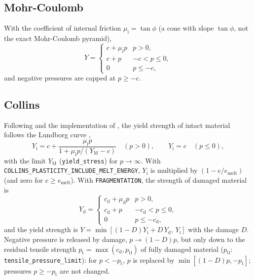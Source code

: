 \documentclass[10pt,fleqn,twoside]{article}
\newcommand{\code}[1]{\texttt{#1}}
\newcommand{\sw}[1]{\texttt{#1}}
\begin{document}
\subsection{Mohr-Coulomb}
With the coefficient of internal friction $\mu_\mathrm{i} = \tan\phi$ (a cone with slope $\tan\phi$, not the exact
Mohr-Coulomb pyramid),
\begin{equation}
 Y = \begin{cases} c + \mu_\mathrm{i} p & p > 0,\\ c + p & -c < p \leq 0,\\ 0 & p \leq -c, \end{cases}
\end{equation}
and negative pressures are capped at $p \geq -c$.

\subsection{Collins}
Following \citet{collins2004} and the implementation of \citet{2015P&SS..107....3J}, the yield strength of intact
material follows the Lundborg curve \citep{lundborg1968},
\begin{equation}
 Y_\mathrm{i} = c + \frac{\mu_\mathrm{i} p}{1 + \mu_\mathrm{i} p/(Y_\mathrm{M} - c)} \quad (p > 0), \qquad
 Y_\mathrm{i} = c \quad (p \leq 0),
\end{equation}
with the limit $Y_\mathrm{M}$ (\code{yield\_stress}) for $p \to \infty$. With
\sw{COLLINS\_PLASTICITY\_INCLUDE\_MELT\_ENERGY}, $Y_\mathrm{i}$ is multiplied by $(1 - e/e_\mathrm{melt})$ (and zero
for $e \geq e_\mathrm{melt}$). With \sw{FRAGMENTATION}, the strength of damaged material is
\begin{equation}
 Y_\mathrm{d} = \begin{cases} c_\mathrm{d} + \mu_\mathrm{d}p & p > 0,\\ c_\mathrm{d} + p & -c_\mathrm{d} < p \leq 0,\\
 0 & p \leq -c_\mathrm{d}, \end{cases}
\end{equation}
and the yield strength is $Y = \min[(1-D)Y_\mathrm{i} + D\,Y_\mathrm{d},\, Y_\mathrm{i}]$ with the damage $D$.
Negative pressure is released by damage, $p \rightarrow (1-D)p$, but only down to the residual tensile strength
$p_\mathrm{t} = \max(c_\mathrm{d}, p_\mathrm{tl})$ of fully damaged material ($p_\mathrm{tl}$:
\code{tensile\_pressure\_limit}): for $p < -p_\mathrm{t}$, $p$ is replaced by $\min[(1-D)p, -p_\mathrm{t}]$; pressures
$p \geq -p_\mathrm{t}$ are not changed.
\end{document}
